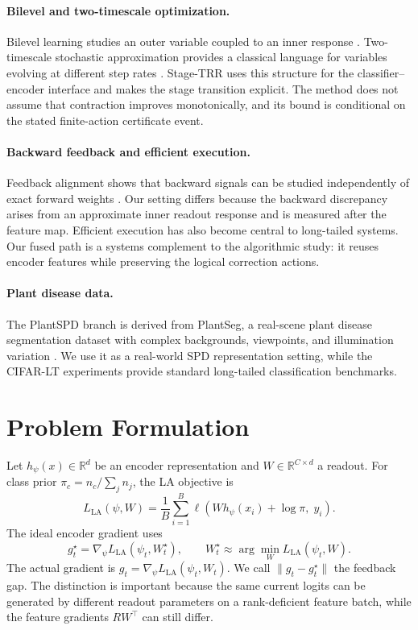 \documentclass[10pt,letterpaper]{article}
\newcommand{\method}{Stage-TRR}
\begin{document}
\paragraph{Bilevel and two-timescale optimization.}
Bilevel learning studies an outer variable coupled to an inner response \citep{franceschi2018bilevel,lorraine2020optimizing,ghadimi2018approximation}. Two-timescale stochastic approximation provides a classical language for variables evolving at different step rates \citep{borkar1997stochastic}. \method{} uses this structure for the classifier--encoder interface and makes the stage transition explicit. The method does not assume that contraction improves monotonically, and its bound is conditional on the stated finite-action certificate event.

\paragraph{Backward feedback and efficient execution.}
Feedback alignment shows that backward signals can be studied independently of exact forward weights \citep{lillicrap2016random}. Our setting differs because the backward discrepancy arises from an approximate inner readout response and is measured after the feature map. Efficient execution has also become central to long-tailed systems. Our fused path is a systems complement to the algorithmic study: it reuses encoder features while preserving the logical correction actions.

\paragraph{Plant disease data.}
The PlantSPD branch is derived from PlantSeg, a real-scene plant disease segmentation dataset with complex backgrounds, viewpoints, and illumination variation \citep{plantseg2025}. We use it as a real-world SPD representation setting, while the CIFAR-LT experiments provide standard long-tailed classification benchmarks.

\section{Problem Formulation}
Let $h_\psi(x)\in\mathbb{R}^d$ be an encoder representation and $W\in\mathbb{R}^{C\times d}$ a readout. For class prior $\pi_c=n_c/\sum_j n_j$, the LA objective is
\[
 L_{\mathrm{LA}}(\psi,W)
 =
 \frac{1}{B}\sum_{i=1}^{B}
 \ell\!\left(W h_\psi(x_i)+\log\pi,\;y_i\right).
\]
The ideal encoder gradient uses
\[
 g_t^\star = \nabla_\psi L_{\mathrm{LA}}(\psi_t,W^\star_t),
 \qquad
 W^\star_t \approx \arg\min_W L_{\mathrm{LA}}(\psi_t,W).
\]
The actual gradient is $g_t=\nabla_\psi L_{\mathrm{LA}}(\psi_t,W_t)$. We call $\|g_t-g_t^\star\|$ the feedback gap. The distinction is important because the same current logits can be generated by different readout parameters on a rank-deficient feature batch, while the feature gradients $R W^\top$ can still differ.
\end{document}
